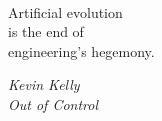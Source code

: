 \newpage
~\\[7cm]
\settowidth{}
\begin{center}
	\parbox{\longest}{%
   		\raggedright{\huge%
		   Artificial evolution\\
		   is the end of\\ 
		   engineering's hegemony.\par\bigskip
		}   
  		\raggedright\large{\textit{Kevin Kelly\\Out of Control}}\par%
	}
\end{center}
\newpage
